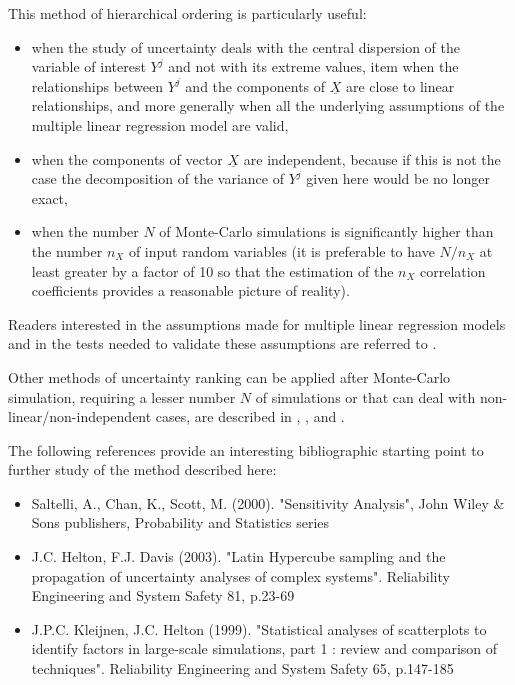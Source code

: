 {
  This method of hierarchical ordering is particularly useful:
  \begin{itemize}
  \item when the study of uncertainty deals with the central dispersion of the variable of interest $Y^j$ and not with its extreme values,
    item when the relationships between $Y^j$ and the components of $\underline{X}$ are close to linear relationships, and more generally when all the underlying assumptions of the multiple linear regression model are valid,
  \item when the components of vector $\underline{X}$ are independent, because if this is not the case the decomposition of the variance of $Y^j$ given here would be no longer exact,
  \item when the number $N$ of Monte-Carlo simulations is significantly higher than the number $n_X$ of input random variables (it is preferable to have $N/n_X$ at least greater by a factor of 10 so that the estimation of the $n_X$ correlation coefficients provides a reasonable picture of reality).
  \end{itemize}

  Readers interested in the assumptions made for multiple linear regression models and in the tests needed to validate these assumptions are referred to .

  Other methods of uncertainty ranking can be applied after Monte-Carlo simulation, requiring a lesser number $N$ of simulations or that can deal with non-linear/non-independent cases, are described in , ,  and .

  The following references provide an interesting bibliographic starting point to further study of the method described here:
  \begin{itemize}
  \item Saltelli, A., Chan, K., Scott, M. (2000). "Sensitivity Analysis", John Wiley \& Sons publishers, Probability and Statistics series
  \item J.C. Helton, F.J. Davis (2003). "Latin Hypercube sampling and the propagation of uncertainty analyses of complex systems". Reliability Engineering and System Safety 81, p.23-69
  \item J.P.C. Kleijnen, J.C. Helton (1999). "Statistical analyses of scatterplots to identify factors in large-scale simulations, part 1 : review and comparison of techniques". Reliability Engineering and System Safety 65, p.147-185
  \end{itemize}
}
